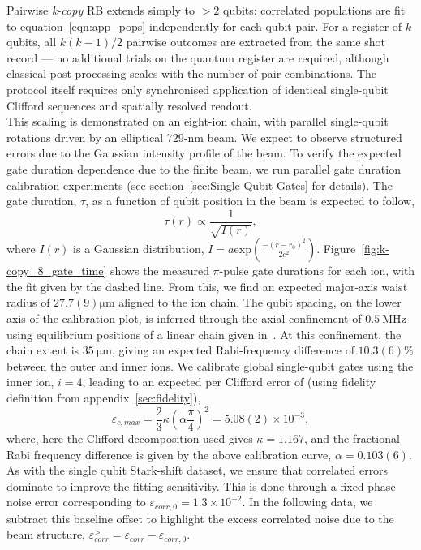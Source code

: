 Pairwise \emph{k-copy} RB extends simply to $>2$ qubits: correlated populations
are fit to equation~\ref{eqn:app_pops} independently for each qubit pair. 
For a register of $k$ qubits, all $k(k-1)/2$
pairwise outcomes are extracted from the same shot record --- no additional
trials on the quantum register are required, although classical
post-processing scales with the number of pair combinations. The protocol
itself requires only synchronised application of identical single-qubit
Clifford sequences and spatially resolved readout.\\
This scaling is demonstrated on an eight-ion chain, with parallel single-qubit
rotations driven by an elliptical 729-nm beam. We expect to
observe structured errors due to the Gaussian intensity profile of the beam. To
verify the expected gate duration dependence due to the finite beam, we run
parallel gate duration calibration experiments (see section~\ref{sec:Single
Qubit Gates} for details). The gate duration, $\tau$, as a function of qubit position in
the beam is expected to follow,
\begin{equation}
\tau(r)\propto\frac{1}{\sqrt{I(r)}},
\end{equation}
where $I(r)$ is a Gaussian distribution, $I=a \mathrm{exp}\left(\frac{-(r-r_0)^2}{2c^2}\right)$. Figure~\ref{fig:k-copy_8_gate_time} shows the measured $\pi$-pulse gate durations for each ion, with the fit given by the dashed line. From this, we find an expected
major-axis waist radius of $27.7(9)\unit{\micro\meter}$ aligned to the ion
chain. The qubit spacing, on the lower axis of the calibration plot, is inferred through the axial confinement of $0.5~\unit{\mega\hertz}$ using equilibrium positions of a linear chain given in~\cite{james_quantum_1998}.
At this confinement, the chain extent is
$35~\unit{\micro\meter}$, giving an expected Rabi-frequency difference of
$10.3(6)\%$ between the outer and inner ions.
We calibrate global single-qubit gates using
the inner ion, $i=4$, leading to an expected per Clifford error of (using fidelity definition from appendix~\ref{sec:fidelity}),
\begin{equation}
\varepsilon_{c,max} = \frac{2}{3}\kappa \left(\alpha\frac{\pi}{4}\right)^2=5.08(2)\times10^{-3},
\end{equation}
where, here the Clifford decomposition used gives $\kappa=1.167$, and the fractional Rabi frequency difference is given by the above calibration curve, $\alpha=0.103(6)$.\\
As with the single qubit Stark-shift dataset, we ensure that correlated errors dominate to improve the fitting sensitivity. This is done through a fixed phase noise error corresponding to $\varepsilon_{corr,0} = 1.3\times10^{-2}$. In the following data, we subtract this baseline offset to highlight the excess correlated noise due to the beam structure, $\varepsilon_{corr}^>=\varepsilon_{corr}-\varepsilon_{corr,0}$.\\
